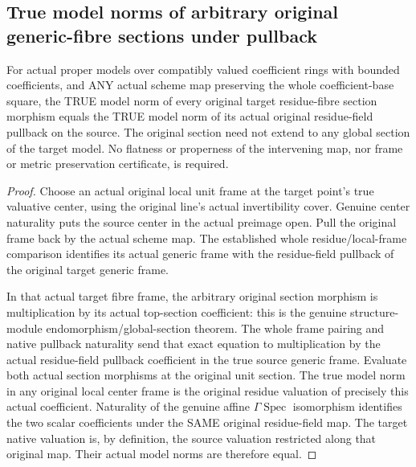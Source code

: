 \subsection{True model norms of arbitrary original generic-fibre sections under pullback}

\begin{theorem}
\label{berkovich:actual-generic-section-hom-model-norm-pullback}
\leanok
{}
For actual proper models over compatibly valued coefficient rings with bounded
coefficients, and ANY actual scheme map preserving the whole coefficient-base
square, the TRUE model norm of every original target residue-fibre section
morphism equals the TRUE model norm of its actual original residue-field
pullback on the source. The original section need not extend to any global
section of the target model. No flatness or properness of the intervening map,
nor frame or metric preservation certificate, is required.
\end{theorem}
\begin{proof}
Choose an actual original local unit frame at the target point's true valuative
center, using the original line's actual invertibility cover. Genuine center
naturality puts the source center in the actual preimage open. Pull the original
frame back by the actual scheme map. The established whole residue/local-frame
comparison identifies its actual generic frame with the residue-field pullback
of the original target generic frame.

In that actual target fibre frame, the arbitrary original section morphism is
multiplication by its actual top-section coefficient: this is the genuine
structure-module endomorphism/global-section theorem. The whole frame pairing
and native pullback naturality send that exact equation to multiplication by
the actual residue-field pullback coefficient in the true source generic frame.
Evaluate both actual section morphisms at the original unit section. The true
model norm in any original local center frame is the original residue valuation
of precisely this actual coefficient. Naturality of the genuine affine
$\Gamma\operatorname{Spec}$ isomorphism identifies the two scalar coefficients
under the SAME original residue-field map. The target native valuation is,
by definition, the source valuation restricted along that original map.
Their actual model norms are therefore equal.
\end{proof}

